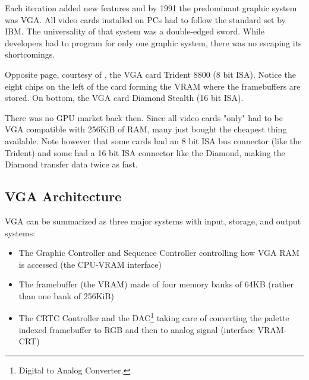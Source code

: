 \documentclass[book.tex]{subfiles}
\begin{document}
Each iteration added new features and by 1991 the predominant graphic system was VGA. All video cards installed on PCs had to follow the standard set by IBM. The universality of that system was a double-edged sword. While developers had to program for only one graphic system, there was no escaping its shortcomings.\\
\par
Opposite page, courtesy of , the VGA card Trident 8800 (8 bit ISA). Notice the eight chips on the left of the card forming the VRAM where the framebuffers are stored\protect\footnotemark. On bottom, the VGA card Diamond Stealth (16 bit ISA).
\pagebreak

\begin{figure}[H] 
  \centering 
  
\end{figure}
\par
\begin{figure}[H] 
  \centering 
\end{figure}
\pagebreak





 There was no GPU market back then. Since all video cards "only" had to be VGA compatible with 256KiB of RAM, many just bought the cheapest thing available. Note however that some cards had an 8 bit ISA bus connector (like the Trident) and some had a 16 bit ISA connector like the Diamond, making the Diamond transfer data twice as fast.\\
\par




\subsection{VGA Architecture}

VGA can be summarized as three major systems with input, storage, and output systems:
\begin{itemize}
\item The Graphic Controller and Sequence Controller controlling how VGA RAM is accessed (the CPU-VRAM interface)
\item The framebuffer (the VRAM) made of four memory banks of 64KB (rather than one bank of 256KiB)
\item The CRTC Controller and the DAC\footnote{Digital to Analog Converter.} taking care of converting the palette indexed framebuffer to RGB and then to analog signal (interface VRAM-CRT)
\end{itemize}
\end{document}
